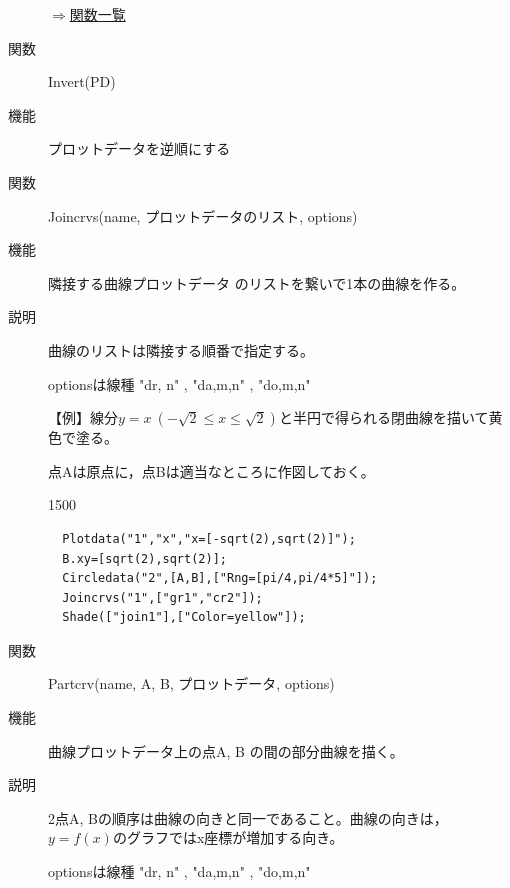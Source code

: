 \documentclass[papersize,a4paper,12pt,uplatex]{jsarticle}
\begin{document}
\begin{description}
\vspace{\baselineskip}
\begin{flushright}  \hyperlink{functionlist}{$\Rightarrow$関数一覧}\end{flushright}


\vspace{\baselineskip}
\hypertarget{invert}{}
\item[関数]  Invert(PD)
\item[機能]  プロットデータを逆順にする

\vspace{\baselineskip}
\hypertarget{joincrvs}{}
\item[関数]  Joincrvs(name, プロットデータのリスト, options) 
\item[機能]  隣接する曲線プロットデータ のリストを繋いで1本の曲線を作る。
\item[説明]  曲線のリストは隣接する順番で指定する。

optionsは線種      "dr, n"  , "da,m,n" , "do,m,n"

\vspace{\baselineskip}
【例】線分$y=x\ (-\sqrt{2} \leq x \leq \sqrt{2})$と半円で得られる閉曲線を描いて黄色で塗る。

点Aは原点に，点Bは適当なところに作図しておく。

\begin{layer}{150}{0}
\end{layer}

\begin{verbatim}
  Plotdata("1","x","x=[-sqrt(2),sqrt(2)]");
  B.xy=[sqrt(2),sqrt(2)];
  Circledata("2",[A,B],["Rng=[pi/4,pi/4*5]"]);
  Joincrvs("1",["gr1","cr2"]);
  Shade(["join1"],["Color=yellow"]);
\end{verbatim}
\vspace{5mm}

\vspace{\baselineskip}
\hypertarget{partcrv}{}
\item[関数]  Partcrv(name, A, B, プロットデータ, options) 
\item[機能]  曲線プロットデータ上の点A, B の間の部分曲線を描く。
\item[説明]    2点A, Bの順序は曲線の向きと同一であること。曲線の向きは，$y=f(x)$のグラフではx座標が増加する向き。

optionsは線種      "dr, n"  , "da,m,n" , "do,m,n"


\end{description}
\end{document}
